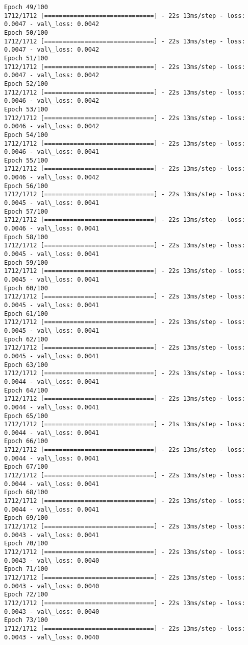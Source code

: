 \documentclass[11pt]{article}
\begin{document}
\begin{Verbatim}[commandchars=\\\{\}]
Epoch 49/100
1712/1712 [==============================] - 22s 13ms/step - loss: 0.0047 - val\_loss: 0.0042
Epoch 50/100
1712/1712 [==============================] - 22s 13ms/step - loss: 0.0047 - val\_loss: 0.0042
Epoch 51/100
1712/1712 [==============================] - 22s 13ms/step - loss: 0.0047 - val\_loss: 0.0042
Epoch 52/100
1712/1712 [==============================] - 22s 13ms/step - loss: 0.0046 - val\_loss: 0.0042
Epoch 53/100
1712/1712 [==============================] - 22s 13ms/step - loss: 0.0046 - val\_loss: 0.0042
Epoch 54/100
1712/1712 [==============================] - 22s 13ms/step - loss: 0.0046 - val\_loss: 0.0041
Epoch 55/100
1712/1712 [==============================] - 22s 13ms/step - loss: 0.0046 - val\_loss: 0.0042
Epoch 56/100
1712/1712 [==============================] - 22s 13ms/step - loss: 0.0045 - val\_loss: 0.0041
Epoch 57/100
1712/1712 [==============================] - 22s 13ms/step - loss: 0.0046 - val\_loss: 0.0041
Epoch 58/100
1712/1712 [==============================] - 22s 13ms/step - loss: 0.0045 - val\_loss: 0.0041
Epoch 59/100
1712/1712 [==============================] - 22s 13ms/step - loss: 0.0045 - val\_loss: 0.0041
Epoch 60/100
1712/1712 [==============================] - 22s 13ms/step - loss: 0.0045 - val\_loss: 0.0041
Epoch 61/100
1712/1712 [==============================] - 22s 13ms/step - loss: 0.0045 - val\_loss: 0.0041
Epoch 62/100
1712/1712 [==============================] - 22s 13ms/step - loss: 0.0045 - val\_loss: 0.0041
Epoch 63/100
1712/1712 [==============================] - 22s 13ms/step - loss: 0.0044 - val\_loss: 0.0041
Epoch 64/100
1712/1712 [==============================] - 22s 13ms/step - loss: 0.0044 - val\_loss: 0.0041
Epoch 65/100
1712/1712 [==============================] - 21s 13ms/step - loss: 0.0044 - val\_loss: 0.0041
Epoch 66/100
1712/1712 [==============================] - 22s 13ms/step - loss: 0.0044 - val\_loss: 0.0041
Epoch 67/100
1712/1712 [==============================] - 22s 13ms/step - loss: 0.0044 - val\_loss: 0.0041
Epoch 68/100
1712/1712 [==============================] - 22s 13ms/step - loss: 0.0044 - val\_loss: 0.0041
Epoch 69/100
1712/1712 [==============================] - 22s 13ms/step - loss: 0.0043 - val\_loss: 0.0041
Epoch 70/100
1712/1712 [==============================] - 22s 13ms/step - loss: 0.0043 - val\_loss: 0.0040
Epoch 71/100
1712/1712 [==============================] - 22s 13ms/step - loss: 0.0043 - val\_loss: 0.0040
Epoch 72/100
1712/1712 [==============================] - 22s 13ms/step - loss: 0.0043 - val\_loss: 0.0040
Epoch 73/100
1712/1712 [==============================] - 22s 13ms/step - loss: 0.0043 - val\_loss: 0.0040

\end{Verbatim}
\end{document}
